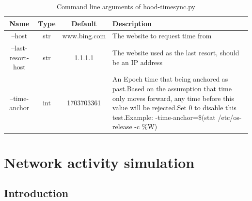 \documentclass[mscthesis]{usiinfthesis}
\begin{document}
\begin{table}[H]
  \centering
  \begin{tabular}{|c|c|c|m{68mm}|}
    \hline
    Name               & Type & Default      & Description                                                                                                                                                                                                                                               \\
    \hline
    --host             & str  & www.bing.com & The website to request time from                                                                                                                                                                                                                          \\
    --last-resort-host & str  & 1.1.1.1      & The website used as the last resort, should be an IP address                                                                                                                                                                                              \\
    --time-anchor      & int  & 1703703361   & An Epoch time that being anchored as past.\newline Based on the assumption that time only moves forward, any time before this value will be rejected.\newline Set 0 to disable this test.\newline Example: -\-time-anchor=\$(stat /etc/os-release -c \%W) \\
    \hline
  \end{tabular}
  \caption{Command line arguments of hood-timesync.py}
  \label{tab:timesync_cmdarg}
\end{table}

\chapter{Network activity simulation}
\section{Introduction}
\end{document}
